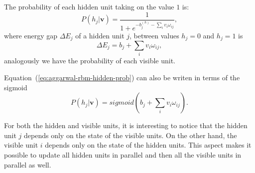 The probability of each hidden unit taking on the value $1$ is:
\begin{equation}
    \label{eq:aggarwal-rbm-hidden-prob}
    P(h_{j} | \mathbf{v}) = \frac{1}{1 + e^{-b^{(h)}_{j} - \sum_{i} v_{i} \omega_{ij}}},
\end{equation}
where energy gap $\Delta E_{j}$ of a hidden unit $j$, between values $h_{j} = 0$ and $h_{j} = 1$ is
\begin{equation}
    \label{eq:aggarwal-rbm-energy-gap-hidden}
    \Delta E_{j} = b_{j} + \sum_{i} v_{i} \omega_{ij},
\end{equation}
analogously we have the probability of each visible unit.

Equation~(\ref{eq:aggarwal-rbm-hidden-prob}) can also be writen in terms of the sigmoid
\begin{equation}
    \label{eq:aggarwal-rbm-hidden-prob-sigmoid}
    P(h_{j} | \mathbf{v}) = sigmoid(b_{j} + \sum_{i} v_{i} \omega_{ij}).
\end{equation}

For both the hidden and visible units, it is interesting to notice that the hidden unit $j$ depends only on the state of the visible units.
On the other hand, the visible unit $i$ depends only on the state of the hidden units.
This aspect makes it possible to update all hidden units in parallel and then all the visible units in parallel as well.

